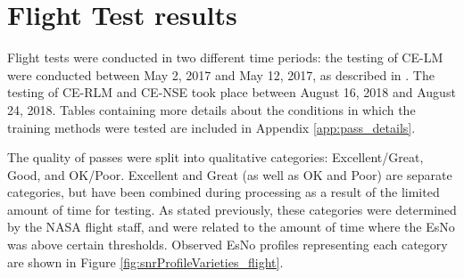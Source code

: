 \section{Flight Test results}
\par Flight tests were conducted in two different time periods: the testing of CE-LM were conducted between May 2, 2017 and May 12, 2017, as described in \cite{tim_implementation_paper}. The testing of CE-RLM and CE-NSE took place between August 16, 2018 and August 24, 2018. Tables containing more details about the conditions in which the training methods were tested are included in Appendix \ref{app:pass_details}. 
\par The quality of passes were split into qualitative categories: Excellent/Great, Good, and OK/Poor. Excellent and Great (as well as OK and Poor) are separate categories, but have been combined during processing as a result of the limited amount of time for testing. As stated previously, these categories were determined by the NASA flight staff, and were related to the amount of time where the EsNo was above certain thresholds. Observed EsNo profiles representing each category are shown in Figure \ref{fig:snrProfileVarieties_flight}.
